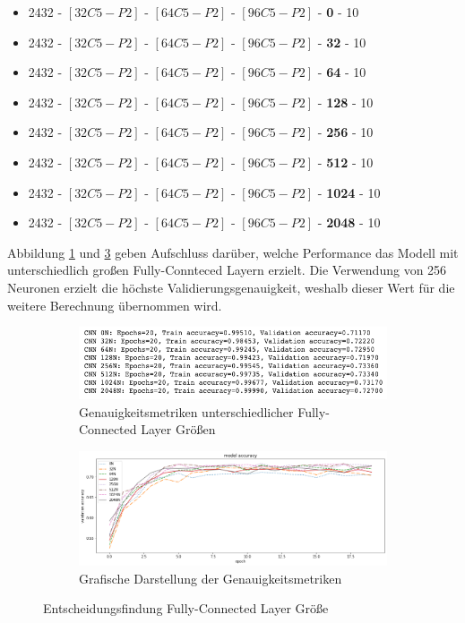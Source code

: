 \begin{itemize}
	\item 2432 - $[32C5-P2]$ - $[64C5-P2]$ - $[96C5-P2]$ - \textbf{0} - 10
	\item 2432 - $[32C5-P2]$ - $[64C5-P2]$ - $[96C5-P2]$ - \textbf{32} - 10
	\item 2432 - $[32C5-P2]$ - $[64C5-P2]$ - $[96C5-P2]$ - \textbf{64} - 10
	\item 2432 - $[32C5-P2]$ - $[64C5-P2]$ - $[96C5-P2]$ - \textbf{128} - 10
	\item 2432 - $[32C5-P2]$ - $[64C5-P2]$ - $[96C5-P2]$ - \textbf{256} - 10
	\item 2432 - $[32C5-P2]$ - $[64C5-P2]$ - $[96C5-P2]$ - \textbf{512} - 10
	\item 2432 - $[32C5-P2]$ - $[64C5-P2]$ - $[96C5-P2]$ - \textbf{1024} - 10
	\item 2432 - $[32C5-P2]$ - $[64C5-P2]$ - $[96C5-P2]$ - \textbf{2048} - 10
\end{itemize}

Abbildung \ref{fig:fullyconnected_results} und \ref{fig:fullyconnected_graph_results} geben Aufschluss darüber, welche Performance das Modell mit unterschiedlich großen Fully-Connteced Layern erzielt. Die Verwendung von 256 Neuronen erzielt die höchste Validierungsgenauigkeit, weshalb dieser Wert für die weitere Berechnung übernommen wird. 

\begin{figure}[htb]
	\centering
	\begin{subfigure}[ht]{.9\textwidth}
		\includegraphics[width=\textwidth]{images/dense_metric}
		\caption{Genauigkeitsmetriken unterschiedlicher Fully-Connected Layer Größen}
		\label{fig:fullyconnected_results}
	\end{subfigure}\hfill%
	\begin{subfigure}[ht]{.9\textwidth}
		\includegraphics[width=\textwidth]{images/dense}
		\caption{Grafische Darstellung der Genauigkeitsmetriken}
		\label{fig:fullyconnected_graph_results}
	\end{subfigure}\hfill%
	\caption{Entscheidungsfindung Fully-Connected Layer Größe}
\end{figure}

